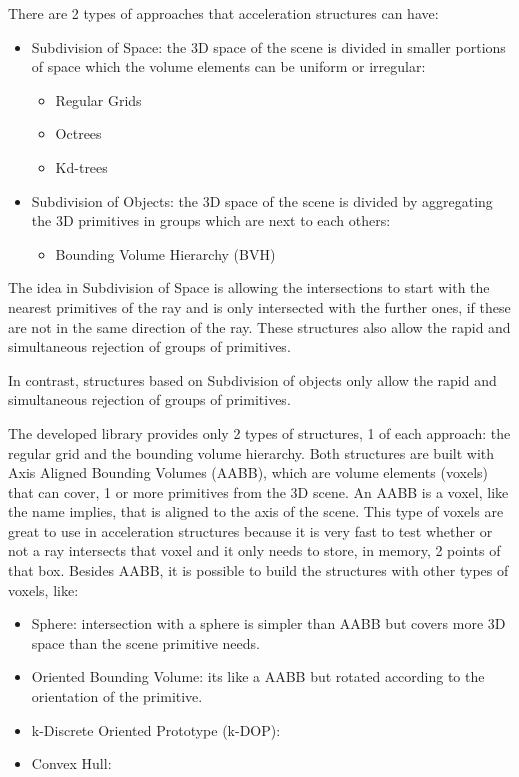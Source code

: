 \par
There are 2 types of approaches that acceleration structures can have:

\begin{itemize}
	\item Subdivision of Space: the 3D space of the scene is divided in smaller portions of space which the volume elements can be uniform or irregular:
	\begin{itemize}
		\item Regular Grids
		\item Octrees
		\item Kd-trees
	\end{itemize}
	\item Subdivision of Objects: the 3D space of the scene is divided by aggregating the 3D primitives in groups which are next to each others:
	\begin{itemize}
		\item Bounding Volume Hierarchy (BVH)
	\end{itemize}
\end{itemize}

\par
The idea in Subdivision of Space is allowing the intersections to start with the nearest primitives of the ray and is only intersected with the further ones, if these are not in the same direction of the ray.
These structures also allow the rapid and simultaneous rejection of groups of primitives.

\par
In contrast, structures based on Subdivision of objects only allow the rapid and simultaneous rejection of groups of primitives.

\par
The developed library provides only 2 types of structures, 1 of each approach: the regular grid and the bounding volume hierarchy.
Both structures are built with Axis Aligned Bounding Volumes (AABB), which are volume elements (voxels) that can cover, 1 or more primitives from the 3D scene.
An AABB is a voxel, like the name implies, that is aligned to the axis of the scene.
This type of voxels are great to use in acceleration structures because it is very fast to test whether or not a ray intersects that voxel and it only needs to store, in memory, 2 points of that box.
Besides AABB, it is possible to build the structures with other types of voxels, like:

\begin{itemize}
	\item Sphere: intersection with a sphere is simpler than AABB but covers more 3D space than the scene primitive needs.
	\item Oriented Bounding Volume: its like a AABB but rotated according to the orientation of the primitive.
	\item k-Discrete Oriented Prototype (k-DOP): 
	\item Convex Hull: 
\end{itemize}

